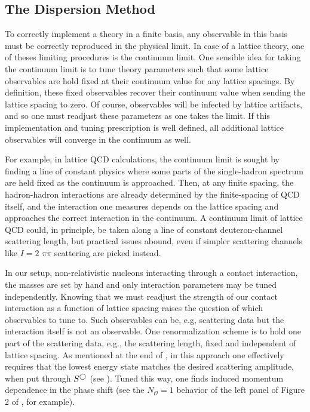 \subsection{The Dispersion Method}\label{sec:dispersion}

To correctly implement a theory in a finite basis, any observable in this basis must be correctly reproduced in the physical limit.
In case of a lattice theory, one of theses limiting procedures is the continuum limit.
One sensible idea for taking the continuum limit is to tune theory parameters such that some lattice observables are hold fixed at their continuum value for any lattice spacings.
By definition, these fixed observables recover their continuum value when sending the lattice spacing to zero.
Of course, observables will be infected by lattice artifacts, and so one must readjust these parameters as one takes the limit.
If this implementation and tuning prescription is well defined, all additional lattice observables will converge in the continuum as well.

For example, in lattice QCD calculations, the continuum limit is sought by finding a line of constant physics where some parts of the single-hadron spectrum are held fixed as the continuum is approached.
Then, at any finite spacing, the hadron-hadron interactions are already determined by the finite-spacing of QCD itself, and the interaction one measures depends on the lattice spacing and approaches the correct interaction in the continuum.
A continuum limit of lattice QCD could, in principle, be taken along a line of constant deuteron-channel scattering length, but practical issues abound, even if simpler scattering channels like $I=2$ $\pi\pi$ scattering are picked instead.

In our setup, non-relativistic nucleons interacting through a contact interaction, the masses are set by hand and only interaction parameters may be tuned independently.
Knowing that we must readjust the strength of our contact interaction as a function of lattice spacing raises the question of which observables to tune to.
Such observables can be, e.g, scattering data but the interaction itself is not an observable.
One renormalization scheme is to hold one part of the scattering data, e.g., the scattering length, fixed and independent of lattice spacing.
As mentioned at the end of , in this approach one effectively requires that the lowest energy state matches the desired scattering amplitude, when put through $S^{\bigcirc}$ (see ).
Tuned this way, one finds induced momentum dependence in the phase shift (see the $N_\mathcal{O}=1$ behavior of the left panel of Figure 2 of , for example).

